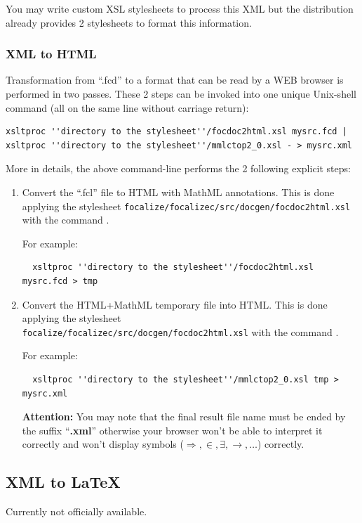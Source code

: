 You may write custom XSL stylesheets to process this XML but the
distribution already provides 2 stylesheets to format this
information.



\subsubsection{XML to HTML}
Transformation from ``.fcd'' to a format that can be read by a WEB
browser is performed in two passes. These 2 steps can be invoked into
one unique Unix-shell command (all on the same line without carriage return):

{\scriptsize
\begin{verbatim}
xsltproc ''directory to the stylesheet''/focdoc2html.xsl mysrc.fcd |
xsltproc ''directory to the stylesheet''/mmlctop2_0.xsl - > mysrc.xml
\end{verbatim}}

\noindent More in details, the above command-line performs the 2 following
explicit steps:
\begin{enumerate}
  \item Convert the ``.fcl'' file to HTML with MathML annotations.
  This is done applying the stylesheet
  {\tt focalize/focalizec/src/docgen/focdoc2html.xsl} with the command
  \xsltproc.

  For example:
  {\scriptsize
  \begin{verbatim}
  xsltproc ''directory to the stylesheet''/focdoc2html.xsl mysrc.fcd > tmp
  \end{verbatim}
  }

  \item Convert the HTML+MathML temporary file into HTML.
  This is done applying the stylesheet\\
  {\tt focalize/focalizec/src/docgen/focdoc2html.xsl} with the command
  \xsltproc.

  For example:
  {\scriptsize
  \begin{verbatim}
  xsltproc ''directory to the stylesheet''/mmlctop2_0.xsl tmp > mysrc.xml
\end{verbatim}}
  \smallskip
  {\bf Attention:}
  You may note that the final result file name must be ended by the
  suffix ``{\bf .xml}'' otherwise your browser won't be able to interpret it
  correctly and won't display symbols ($\Rightarrow, \in, \exists,
  \rightarrow, \ldots$) correctly.
\end{enumerate}

\subsection{XML to LaTeX}

Currently not officially available.
